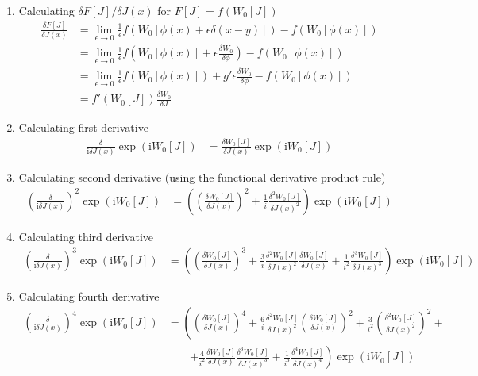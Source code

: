 \documentclass[10pt,a4paper]{article}
\theoremstyle{definition}
\begin{document}
\begin{enumerate}
\item Calculating $\delta F[J]/\delta J(x)$ for $F[J]=f\left(W_0[J]\right)$
    \begin{align}
        \frac{\delta F[J]}{\delta J(x)}
        &=\lim_{\epsilon\rightarrow0}\frac{1}{\epsilon}f(W_0[\phi(x)+\epsilon\delta(x-y)])-f(W_0[\phi(x)])\\
        &=\lim_{\epsilon\rightarrow0}\frac{1}{\epsilon}f(W_0[\phi(x)]+\epsilon\frac{\delta W_0}{\delta \phi})-f(W_0[\phi(x)])\\
        &=\lim_{\epsilon\rightarrow0}\frac{1}{\epsilon}f(W_0[\phi(x)])+g' \epsilon\frac{\delta W_0}{\delta \phi}-f(W_0[\phi(x)])\\
        &=f'(W_0[J])\frac{\delta W_0}{\delta J}
    \end{align}
\item Calculating first derivative
\begin{align}
    \frac{\delta}{\text{i}\delta J(x)}\exp\left(\text{i}W_0[J]\right)
    &=\frac{\delta W_0[J]}{\delta J(x)}\exp\left(\text{i}W_0[J]\right)
\end{align}
\item Calculating second derivative (using the functional derivative product rule)
\begin{align}
    \left(\frac{\delta}{\text{i}\delta J(x)}\right)^2\exp\left(\text{i}W_0[J]\right)
    &=\left(\left(\frac{\delta W_0[J]}{\delta J(x)}\right)^2+\frac{1}{i}\frac{\delta^2 W_0[J]}{\delta J(x)^2}\right)\exp\left(\text{i}W_0[J]\right)
\end{align}
\item Calculating third derivative
\begin{align}
    \left(\frac{\delta}{\text{i}\delta J(x)}\right)^3\exp\left(\text{i}W_0[J]\right)
    &=\left(\left(\frac{\delta W_0[J]}{\delta J(x)}\right)^3+\frac{3}{i}\frac{\delta^2 W_0[J]}{\delta J(x)^2}\frac{\delta W_0[J]}{\delta J(x)}+\frac{1}{i^2}\frac{\delta^3 W_0[J]}{\delta J(x)^3}\right)\exp\left(\text{i}W_0[J]\right)
\end{align}
\item Calculating fourth derivative
\begin{align*}
    \left(\frac{\delta}{\text{i}\delta J(x)}\right)^4\exp\left(\text{i}W_0[J]\right)
    &=\left(\left(\frac{\delta W_0[J]}{\delta J(x)}\right)^4+\frac{6}{i}\frac{\delta^2 W_0[J]}{\delta J(x)^2}\left(\frac{\delta W_0[J]}{\delta J(x)}\right)^2+\frac{3}{i^2}\left(\frac{\delta^2 W_0[J]}{\delta J(x)^2}\right)^2+\right.\\
    &\qquad\left.+\frac{4}{i^2}\frac{\delta W_0[J]}{\delta J(x)}\frac{\delta^3 W_0[J]}{\delta J(x)^3} +\frac{1}{i^3}\frac{\delta^4 W_0[J]}{\delta J(x)^4}\right)\exp\left(\text{i}W_0[J]\right)\\

\end{align*}
\end{enumerate}
\end{document}
